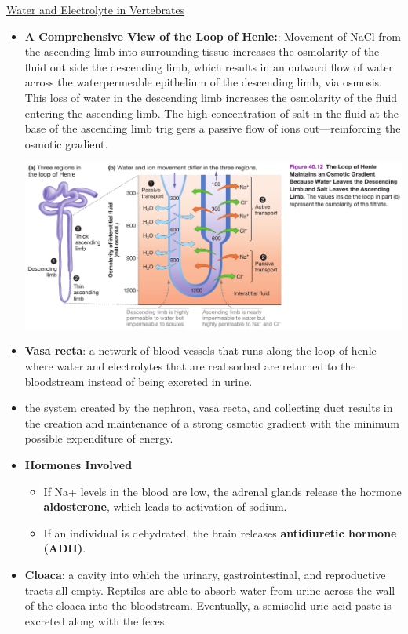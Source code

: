 \documentclass[12pt,letterpaper]{article}
\begin{document}
\begin{secbox}{\hyperlink{40}{Water and Electrolyte in Vertebrates}}
{\begin{itemize}
        \item \textbf{A Comprehensive View of the Loop of Henle:}: Movement of NaCl from the ascending limb into surrounding tissue increases the osmolarity of the fluid out­ side the descending limb, which results in an outward flow of water across the water­permeable epithelium of the descending limb, via osmosis. This loss of water in the descending limb increases the osmolarity of the fluid entering the ascending limb. The high concentration of salt in the fluid at the base of the ascending limb trig­ gers a passive flow of ions out—reinforcing the osmotic gradient.\par
        \includegraphics[width=\linewidth]{images/loop-of-henle.png}
        \item \textbf{Vasa recta}: a network of blood vessels that runs along the loop of henle where water and electrolytes that are reabsorbed are returned to the bloodstream instead of being excreted in urine.
        \item the system created by the nephron, vasa recta, and collecting duct results in the creation and maintenance of a strong osmotic gradient with the minimum possible expenditure of energy.
        \item \textbf{Hormones Involved}
            \begin{itemize}
                \item If Na+ levels in the blood are low, the adrenal glands release the hormone \textbf{aldosterone}, which leads to activation of sodium.
                \item  If an individual is dehydrated, the brain releases \textbf{antidiuretic hormone (ADH)}.
            \end{itemize}
        \item \textbf{Cloaca}: a cavity into which the urinary, gastrointestinal, and reproductive tracts all empty. Reptiles are able to absorb water from urine across the wall of the cloaca into the bloodstream. Eventually, a semisolid uric acid paste is excreted along with the feces.
    \end{itemize}
}\end{secbox}
\end{document}

